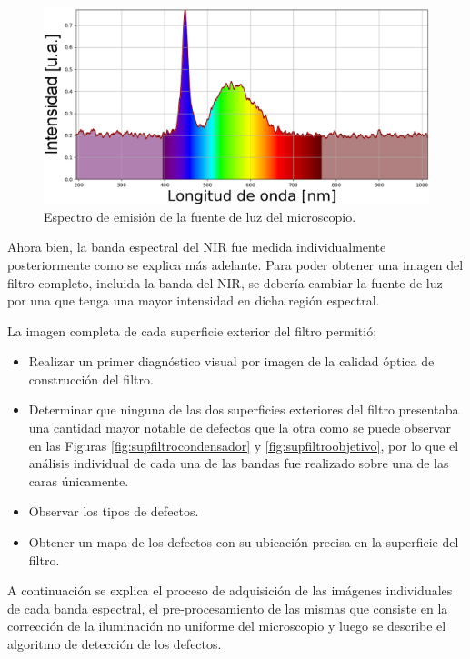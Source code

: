 \begin{figure}[H]
	\centering
	\includegraphics[width=1.0\textwidth]{Figs/defectosZEISS/espectrolampZEISSacolor.png}
	\caption{Espectro de emisión de la fuente de luz del microscopio.}
	\label{fig:espectrolamparazeiss}
\end{figure}

Ahora bien, la banda espectral del NIR fue medida individualmente posteriormente como se explica más adelante. Para poder obtener una imagen del filtro completo, incluida la banda del NIR, se debería cambiar la fuente de luz por una que tenga una mayor intensidad en dicha región espectral.

La imagen completa de cada superficie exterior del filtro permitió:
\begin{itemize}
	\item Realizar un primer diagnóstico visual por imagen de la calidad óptica de construcción del filtro. 
	\item Determinar que ninguna de las dos superficies exteriores del filtro presentaba una cantidad mayor notable de defectos que la otra como se puede observar en las Figuras \ref{fig:supfiltrocondensador} y \ref{fig:supfiltroobjetivo}, por lo que el análisis individual de cada una de las bandas fue realizado sobre una de las caras únicamente.
	\item Observar los tipos de defectos.
	\item Obtener un mapa de los defectos con su ubicación precisa en la superficie del filtro.
\end{itemize}

A continuación se explica el proceso de adquisición de las imágenes individuales de cada banda espectral, el pre-procesamiento de las mismas que consiste en la corrección de la iluminación no uniforme del microscopio y luego se describe el algoritmo de detección de los defectos.

